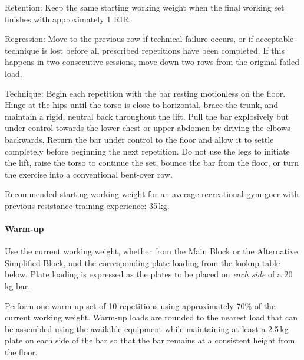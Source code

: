 \documentclass[11pt,a4paper]{article}
\begin{document}
Retention: Keep the same starting working weight when the final working set finishes with approximately 1 RIR.

Regression: Move to the previous row if technical failure occurs, or if acceptable technique is lost before all prescribed repetitions have been completed. If this happens in two consecutive sessions, move down two rows from the original failed load.

Technique: Begin each repetition with the bar resting motionless on the floor. Hinge at the hips until the torso is close to horizontal, brace the trunk, and maintain a rigid, neutral back throughout the lift. Pull the bar explosively but under control towards the lower chest or upper abdomen by driving the elbows backwards. Return the bar under control to the floor and allow it to settle completely before beginning the next repetition. Do not use the legs to initiate the lift, raise the torso to continue the set, bounce the bar from the floor, or turn the exercise into a conventional bent-over row.

Recommended starting working weight for an average recreational gym-goer with previous resistance-training experience: 35\,kg.

\paragraph{Warm-up}

Use the current working weight, whether from the Main Block or the Alternative Simplified Block, and the corresponding plate loading from the lookup table below. Plate loading is expressed as the plates to be placed on \emph{each side} of a 20\,kg bar.

Perform one warm-up set of 10 repetitions using approximately 70\% of the current working weight. Warm-up loads are rounded to the nearest load that can be assembled using the available equipment while maintaining at least a 2.5\,kg plate on each side of the bar so that the bar remains at a consistent height from the floor.
\end{document}
